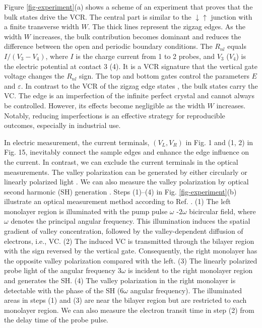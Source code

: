 \documentclass{jpsj3}
\begin{document}
Figure \ref{fig-experiment}(a)
shows a scheme of an experiment that proves that the bulk states drive the VCR.
The central part is similar to the $\downarrow\uparrow$ junction
with a finite transverse width $W$.
The thick lines represent the zigzag edges.
As the width $W$
increases, the bulk contribution becomes dominant and reduces the difference
between the open and periodic boundary conditions.
The $R_{nl}$ equals $I/(V_3-V_4)$, where $I$ is the charge current
from 1 to 2 probes, and $V_3$ ($V_4$) is the electric potential
at contact 3 (4). It is a VCR signature that the vertical gate
voltage changes the $R_{nl}$ sign.
The top and bottom gates control the parameters $E$ and $\varepsilon$.
In contrast  to the VCR of the zigzag edge states \cite{40.}, the bulk states carry the VC.
The edge is an imperfection of the infinite perfect crystal
and cannot always be controlled.
However, its effects become negligible as the width $W$ increases.
Notably, reducing imperfections is an effective strategy for reproducible outcomes, especially in industrial use.

In electric measurement,
the current terminals, $(V_L, V_R)$ in Fig. 1 and (1, 2) in Fig. 15,
inevitably connect the sample edges and enhance the edge influence
on the current.
In contrast, we can exclude the current terminals in the optical measurements.
The valley polarization can be generated 
by either circularly \cite{a1.,a2.,L-1.,L-5.,L-6.,L-7.,Dixit-1,Dixit-2} or linearly
polarized light \cite{L-3.,L-10.}. We can also measure 
the valley polarization by optical second harmonic (SH) generation \cite{L-8.,L-9.}.
Steps (1)--(4) in Fig. \ref{fig-experiment}(b) illustrate an optical measurement method according to Ref. \cite{Dixit-1} .
(1) The left monolayer region is illuminated with the pump pulse $\omega$ -$2\omega$ bicircular field, where $\omega$ denotes the principal angular frequency.
This illumination induces the spatial gradient of valley concentration, followed by the valley-dependent diffusion of electrons, i.e., VC.
(2) The induced VC is transmitted through the bilayer region with the sign reversed by the vertical gate. Consequently, the right monolayer has the opposite valley polarization compared with the left.
(3) The linearly polarized probe light 
of the angular frequency $3\omega$ is incident to
the right monolayer region and generates the SH.
(4) The valley polarization in the right monolayer is
detectable with the phase of the SH ($6\omega$ angular frequency).
The illuminated areas in steps (1) and (3) are near the bilayer region but are restricted to each monolayer region.
We can also measure the electron transit time in step (2) from the delay time of the probe pulse.
\end{document}
